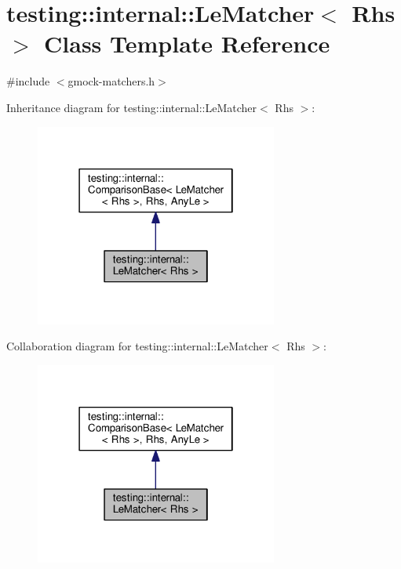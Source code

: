 \hypertarget{classtesting_1_1internal_1_1LeMatcher}{}\section{testing\+:\+:internal\+:\+:Le\+Matcher$<$ Rhs $>$ Class Template Reference}
\label{classtesting_1_1internal_1_1LeMatcher}


{\ttfamily \#include $<$gmock-\/matchers.\+h$>$}



Inheritance diagram for testing\+:\+:internal\+:\+:Le\+Matcher$<$ Rhs $>$\+:\nopagebreak
\begin{figure}[H]
\begin{center}
\leavevmode
\includegraphics[width=226pt]{classtesting_1_1internal_1_1LeMatcher__inherit__graph}
\end{center}
\end{figure}


Collaboration diagram for testing\+:\+:internal\+:\+:Le\+Matcher$<$ Rhs $>$\+:\nopagebreak
\begin{figure}[H]
\begin{center}
\leavevmode
\includegraphics[width=226pt]{classtesting_1_1internal_1_1LeMatcher__coll__graph}
\end{center}
\end{figure}
